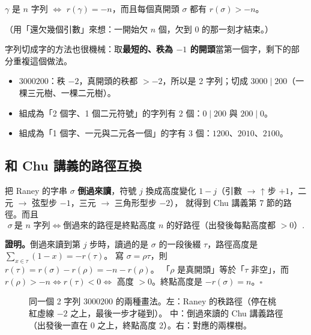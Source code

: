 \begin{thmbox}
$\gamma$ 是 $n$ 字列 $\iff$ $r(\gamma)=-n$，而且每個真開頭 $\sigma$ 都有 $r(\sigma)>-n$。
\end{thmbox}
（用「還欠幾個引數」來想：一開始欠 $n$ 個，欠到 0 的那一刻才結束。）

字列切成字的方法也很機械：取\textbf{最短的、秩為 $-1$ 的開頭}當第一個字，剩下的部分重複這個做法。

\begin{exbox}[例]
\begin{itemize}[leftmargin=1.2em]
  \item $3000200$：秩 $-2$，真開頭的秩都 $>-2$，所以是 2 字列；切成 $3000\mid200$（一棵三元樹、一棵二元樹）。
  \item 組成為「2 個字、1 個二元符號」的字列有 2 個：$0\mid200$ 與 $200\mid0$。
  \item 組成為「1 個字、一元與二元各一個」的字有 3 個：$1200$、$2010$、$2100$。
\end{itemize}
\end{exbox}

\subsection{和 Chu 講義的路徑互換}\label{ssec:convert}

\begin{thmbox}
把 Raney 的字串 $\sigma$ \textbf{倒過來讀}，符號 $j$ 換成高度變化 $1-j$（引數 $\to$ ↑ 步 $+1$，二元 $\to$ 弦型步 $-1$，三元 $\to$ 三角形型步 $-2$），
就得到 Chu 講義第 7 節的路徑。而且
\[
\sigma\ \text{是 $n$ 字列}\iff\text{倒過來的路徑是終點高度 $n$ 的好路徑（出發後每點高度都 $>0$）}.
\]
\end{thmbox}

\textbf{證明。}倒過來讀到第 $j$ 步時，讀過的是 $\sigma$ 的一段後綴 $\tau$，路徑高度是 $\sum_{x\in\tau}(1-x)=-r(\tau)$。
寫 $\sigma=\rho\tau$，則 $r(\tau)=r(\sigma)-r(\rho)=-n-r(\rho)$。
「$\rho$ 是真開頭」等於「$\tau$ 非空」，而 $r(\rho)>-n\iff r(\tau)<0\iff$ 高度 $>0$。終點高度是 $-r(\sigma)=n$。\hfill$\square$

\begin{figure}[H]
\centering
\RanTwoViews
\caption{同一個 2 字列 $3000200$ 的兩種畫法。左：Raney 的秩路徑（停在桃紅虛線 $-2$ 之上，最後一步才碰到）。
中：倒過來讀的 Chu 講義路徑（出發後一直在 0 之上，終點高度 2）。右：對應的兩棵樹。}
\label{fig:twoviews}
\end{figure}


